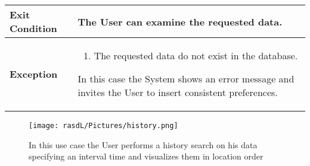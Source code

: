\begin{table}[H]
\begin{tabular}{|p{3.5cm}|p{10.3cm}|}
    \hline
    
    \textbf{\large{Exit Condition}} 	& The User can examine the requested data. \\
    
    \hline
    
    \textbf{\large{Exception}} 			& \begin{enumerate}[leftmargin=0.5cm]                                           \item The requested data do not                                         exist in the database. 
                                        \end{enumerate}
                                        In this case the System shows an error message and invites the User to insert consistent preferences.\\
    
    \hline
    
    \end{tabular}
	
\end{table}
\begin{figure}[H]
    \centering
    \texttt{[image: rasdL/Pictures/history.png]}
     \caption{In this use case the User performs a history search on his data specifying an interval time and visualizes them in location order}
    
\end{figure}
